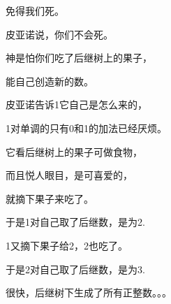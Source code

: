 \begin{centering}
免得我们死。

皮亚诺说，你们不会死。

神是怕你们吃了后继树上的果子，

能自己创造新的数。\vsp

皮亚诺告诉1它自己是怎么来的，

1对单调的只有0和1的加法已经厌烦。

它看后继树上的果子可做食物，

而且悦人眼目，是可喜爱的，

就摘下果子来吃了。\vsp

于是1对自己取了后继数，是为2.

1又摘下果子给2，2也吃了。

于是2对自己取了后继数，是为3.

很快，后继树下生成了所有正整数。。。

\end{centering}

